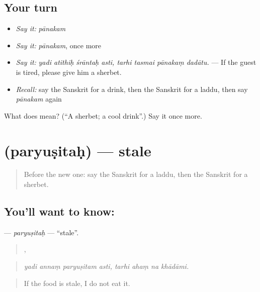 \subsection*{Your turn}
\begin{itemize}
\raggedright
  \item \emph{Say it:} \emph{pānakam}
  \item \emph{Say it:} \emph{pānakam}, once more
  \item \emph{Say it:} \emph{yadi atithiḥ śrāntaḥ asti, tarhi tasmai pānakaṃ dadātu.} — If the guest is tired, please give him a sherbet.
  \item \emph{Recall:} say the Sanskrit for a drink, then the Sanskrit for a laddu, then say \emph{pānakam} again
\end{itemize}

\begin{tcolorbox}[breakable,colback=teal!4,colframe=teal!35!black,title={Before you move on}]
What does  mean? (\textquotedblleft{}A sherbet; a cool drink\textquotedblright{}.) Say it once more.
\end{tcolorbox}
\section[\texorpdfstring{\sk{पर्युषितः} (paryuṣitaḥ)}{पर्युषितः (paryuṣitaḥ)}]{ (paryuṣitaḥ) — stale}

\label{lesson:SA-C530-paryusitah}



\begin{quote}
Before the new one: say the Sanskrit for a laddu, then the Sanskrit for a sherbet.
\end{quote}

\subsection*{You'll want to know: }
\textbf{} — \emph{paryuṣitaḥ} — \textquotedblleft{}stale\textquotedblright{}.

\begin{quote}
   ,    
\end{quote}

\begin{quote}
\emph{yadi annaṃ paryuṣitam asti, tarhi ahaṃ na khādāmi.}
\end{quote}

\begin{quote}
If the food is stale, I do not eat it.
\end{quote}

